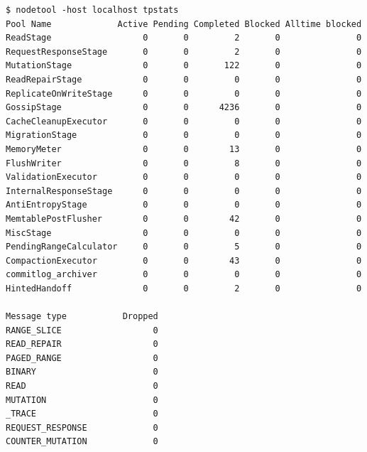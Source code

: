 \documentclass{article} %
\begin{document}
\begin{lstlisting}[style=bash, columns=fixed, caption={statystyki dla puli wątków z~podziałem na zadania}]
$ nodetool -host localhost tpstats
Pool Name             Active Pending Completed Blocked Alltime blocked
ReadStage                  0       0         2       0               0
RequestResponseStage       0       0         2       0               0
MutationStage              0       0       122       0               0
ReadRepairStage            0       0         0       0               0
ReplicateOnWriteStage      0       0         0       0               0
GossipStage                0       0      4236       0               0
CacheCleanupExecutor       0       0         0       0               0
MigrationStage             0       0         0       0               0
MemoryMeter                0       0        13       0               0
FlushWriter                0       0         8       0               0
ValidationExecutor         0       0         0       0               0
InternalResponseStage      0       0         0       0               0
AntiEntropyStage           0       0         0       0               0
MemtablePostFlusher        0       0        42       0               0
MiscStage                  0       0         0       0               0
PendingRangeCalculator     0       0         5       0               0
CompactionExecutor         0       0        43       0               0
commitlog_archiver         0       0         0       0               0
HintedHandoff              0       0         2       0               0

Message type           Dropped
RANGE_SLICE                  0
READ_REPAIR                  0
PAGED_RANGE                  0
BINARY                       0
READ                         0
MUTATION                     0
_TRACE                       0
REQUEST_RESPONSE             0
COUNTER_MUTATION             0
\end{lstlisting}

\pagebreak
\end{document}
